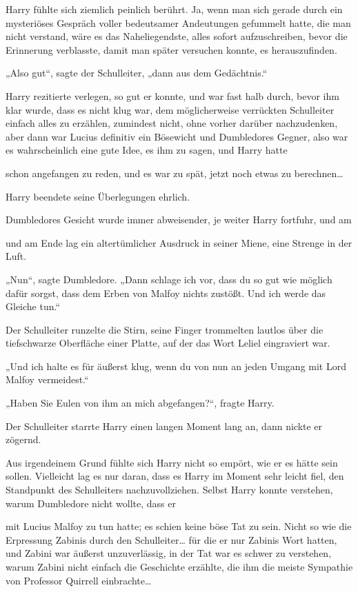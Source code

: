 {Harry fühlte sich ziemlich peinlich berührt. Ja, wenn man sich gerade durch ein mysteriöses Gespräch voller bedeutsamer Andeutungen gefummelt hatte, die man nicht verstand, wäre es das Naheliegendste, alles sofort aufzuschreiben, bevor die Erinnerung verblasste, damit man später versuchen konnte, es herauszufinden.

„Also gut“, sagte der Schulleiter, „dann aus dem Gedächtnis.“

Harry rezitierte verlegen, so gut er konnte, und war fast halb durch, bevor ihm klar wurde, dass es nicht klug war, dem möglicherweise verrückten Schulleiter einfach alles zu erzählen, zumindest nicht, ohne vorher darüber nachzudenken, aber dann war Lucius definitiv ein Bösewicht und Dumbledores Gegner, also war es wahrscheinlich eine gute Idee, es ihm zu sagen, und Harry hatte

schon angefangen zu reden, und es war zu spät, jetzt noch etwas zu berechnen…

Harry beendete seine Überlegungen ehrlich.

Dumbledores Gesicht wurde immer abweisender, je weiter Harry fortfuhr, und am

und am Ende lag ein altertümlicher Ausdruck in seiner Miene, eine Strenge in der Luft.

„Nun“, sagte Dumbledore. „Dann schlage ich vor, dass du so gut wie möglich dafür sorgst, dass dem Erben von Malfoy nichts zustößt. Und ich werde das Gleiche tun.“

Der Schulleiter runzelte die Stirn, seine Finger trommelten lautlos über die tiefschwarze Oberfläche einer Platte, auf der das Wort Leliel eingraviert war.

„Und ich halte es für äußerst klug, wenn du von nun an jeden Umgang mit Lord Malfoy vermeidest.“

„Haben Sie Eulen von ihm an mich abgefangen?“, fragte Harry.

Der Schulleiter starrte Harry einen langen Moment lang an, dann nickte er zögernd.

Aus irgendeinem Grund fühlte sich Harry nicht so empört, wie er es hätte sein sollen. Vielleicht lag es nur daran, dass es Harry im Moment sehr leicht fiel, den Standpunkt des Schulleiters nachzuvollziehen. Selbst Harry konnte verstehen, warum Dumbledore nicht wollte, dass er

mit Lucius Malfoy zu tun hatte; es schien keine böse Tat zu sein. Nicht so wie die Erpressung Zabinis durch den Schulleiter… für die er nur Zabinis Wort hatten, und Zabini war äußerst unzuverlässig, in der Tat war es schwer zu verstehen, warum Zabini nicht einfach die Geschichte erzählte, die ihm die meiste Sympathie von Professor Quirrell einbrachte…

}
